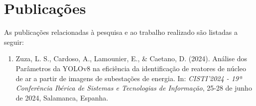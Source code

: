 \newpage
\thispagestyle{empty}
\section*{Publicações}

As publicações relacionadas à pesquisa e ao trabalho realizado são listadas a seguir:

\begin{enumerate}[label=\arabic*.]
    \item Zuza, L. S., Cardoso, A., Lamounier, E., \& Caetano, D. (2024). Análise dos Parâmetros da YOLOv8 na eficiência da identificação de reatores de núcleo de ar a partir de imagens de subestações de energia. In: \textit{CISTI'2024 - 19ª Conferência Ibérica de Sistemas e Tecnologias de Informação}, 25-28 de junho de 2024, Salamanca, Espanha. 
\end{enumerate}

\newpage

